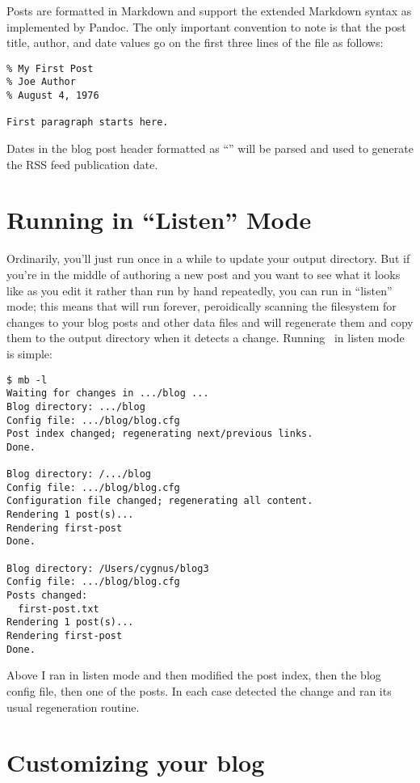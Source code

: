 \documentclass[11pt, letterpaper, oneside, titlepage]{book}
\begin{document}
Posts are formatted in Markdown and support the extended Markdown
syntax as implemented by Pandoc.  The only important convention to
note is that the post title, author, and date values go on the first
three lines of the file as follows:

\begin{verbatim}
% My First Post
% Joe Author
% August 4, 1976

First paragraph starts here.
\end{verbatim}

Dates in the blog post header formatted as ``'' will be parsed and used to generate the RSS feed
publication date.

\section{Running  in ``Listen'' Mode}

Ordinarily, you'll just run  once in a while to update your
output directory.  But if you're in the middle of authoring a new post
and you want to see what it looks like as you edit it rather than run
 by hand repeatedly, you can run  in ``listen'' mode;
this means that  will run forever, peroidically scanning the
filesystem for changes to your blog posts and other data files and
will regenerate them and copy them to the output directory when it
detects a change.  Running \mathblog\ in listen mode is simple:

\begin{verbatim}
$ mb -l
Waiting for changes in .../blog ...
Blog directory: .../blog
Config file: .../blog/blog.cfg
Post index changed; regenerating next/previous links.
Done.

Blog directory: /.../blog
Config file: .../blog/blog.cfg
Configuration file changed; regenerating all content.
Rendering 1 post(s)...
Rendering first-post
Done.

Blog directory: /Users/cygnus/blog3
Config file: .../blog/blog.cfg
Posts changed:
  first-post.txt
Rendering 1 post(s)...
Rendering first-post
Done.
\end{verbatim}

Above I ran  in listen mode and then modified the post index,
then the blog config file, then one of the posts.  In each case
 detected the change and ran its usual regeneration routine.

\section{Customizing your blog}
\label{ref:customizing}
\end{document}
